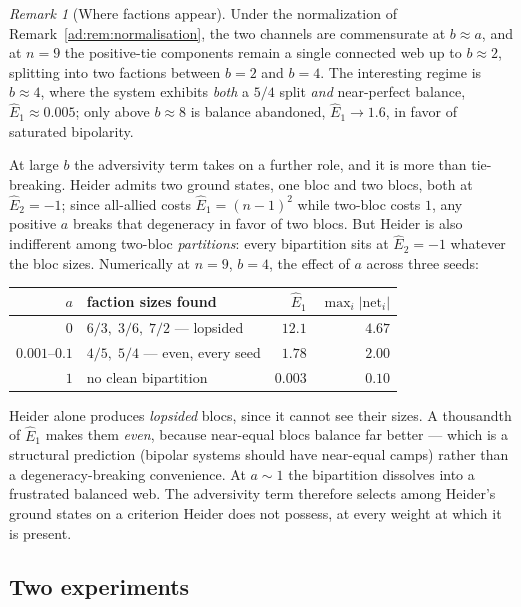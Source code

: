 \documentclass[11pt]{article}
\numberwithin{equation}{section}
\theoremstyle{plain}
\theoremstyle{definition}
\theoremstyle{remark}
\newtheorem{remark}[theorem]{Remark}
\begin{document}
\begin{remark}[Where factions appear]\label{ad:rem:factions}
Under the normalization of Remark~\ref{ad:rem:normalisation}, the two
channels are commensurate at $b\approx a$, and at $n=9$ the positive-tie
components remain a single connected web up to $b\approx2$, splitting
into two factions between $b=2$ and $b=4$. The interesting regime is
$b\approx4$, where the system exhibits \emph{both} a $5/4$ split
\emph{and} near-perfect balance, $\hat E_1\approx0.005$; only above
$b\approx8$ is balance abandoned, $\hat E_1\to1.6$, in favor of
saturated bipolarity.

At large $b$ the adversivity term takes on a further role, and it is
more than tie-breaking. Heider admits two ground states, one bloc and
two blocs, both at $\hat E_2=-1$; since all-allied costs
$\hat E_1=(n-1)^{2}$ while two-bloc costs $1$, any positive $a$ breaks
that degeneracy in favor of two blocs. But Heider is also indifferent
among two-bloc \emph{partitions}: every bipartition sits at $\hat E_2=
-1$ whatever the bloc sizes. Numerically at $n=9$, $b=4$, the effect of
$a$ across three seeds:
\begin{center}\small
\begin{tabular}{@{}rlrr@{}}
\toprule
$a$ & faction sizes found & $\hat E_1$ & $\max_i|\mathrm{net}_i|$\\
\midrule
$0$ & $6/3,\;3/6,\;7/2$ --- lopsided & $12.1$ & $4.67$\\
$0.001$--$0.1$ & $4/5,\;5/4$ --- even, every seed & $1.78$ & $2.00$\\
$1$ & no clean bipartition & $0.003$ & $0.10$\\
\bottomrule
\end{tabular}
\end{center}
Heider alone produces \emph{lopsided} blocs, since it cannot see their
sizes. A thousandth of $\hat E_1$ makes them \emph{even}, because
near-equal blocs balance far better --- which is a structural prediction
(bipolar systems should have near-equal camps) rather than a
degeneracy-breaking convenience. At $a\sim1$ the bipartition dissolves
into a frustrated balanced web. The adversivity term therefore selects
among Heider's ground states on a criterion Heider does not possess, at
every weight at which it is present.
\end{remark}

\subsection{Two experiments}\label{ad:sub:experiments}
\end{document}
